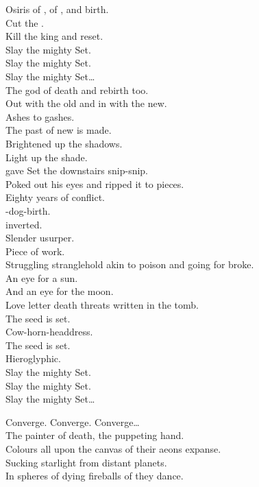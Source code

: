 Osiris of , of , and birth. \\
Cut the . \\
Kill the king and reset. \\

Slay the mighty Set. \\
Slay the mighty Set. \\
Slay the mighty Set… \\

The god of death and rebirth too. \\
Out with the old and in with the new. \\
Ashes to gashes. \\
The past of new  is made. \\
Brightened up the shadows. \\
Light up the shade. \\
 gave Set the downstairs snip-snip. \\
Poked out his eyes and ripped it to pieces. \\
Eighty years of conflict. \\
-dog-birth. \\
 inverted. \\
Slender usurper. \\
Piece of work. \\
Struggling stranglehold akin to poison and going for broke. \\
An eye for a sun. \\
And an eye for the moon. \\
Love letter death threats written in the tomb. \\

The seed is set. \\
Cow-horn-headdress. \\
The seed is set. \\
Hieroglyphic. \\

Slay the mighty Set. \\
Slay the mighty Set. \\
Slay the mighty Set… \\


Converge. Converge. Converge… \\

The painter of death, the puppeting hand. \\
Colours all upon the canvas of their aeons expanse. \\
Sucking starlight from distant planets. \\
In spheres of dying fireballs of  they dance. \\

